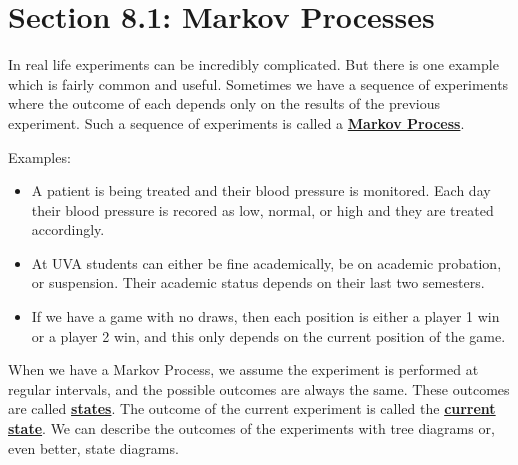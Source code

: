 \documentclass[14,fleqn]{article}
\newcommand{\defn}[1]{\textbf{\underline{#1}}}
\begin{document}
\section{Section 8.1: Markov Processes}

In real life experiments can be incredibly complicated. But there is one example which is fairly common and useful. Sometimes we have a sequence of experiments where the outcome of each depends only on the results of the previous experiment. Such a sequence of experiments is called a \defn{Markov Process}.

Examples:
\begin{itemize}
	\item A patient is being treated and their blood pressure is monitored. Each day their blood pressure is recored as low, normal, or high and they are treated accordingly.
	\item At UVA students can either be fine academically, be on academic probation, or suspension. Their academic status depends on their last two semesters.
	\item If we have a game with no draws, then each position is either a player 1 win or a player 2 win, and this only depends on the current position of the game.
\end{itemize}

When we have a Markov Process, we assume the experiment is performed at regular intervals, and the possible outcomes are always the same. These outcomes are called \defn{states}. The outcome of the current experiment is called the \defn{current state}. We can describe the outcomes of the experiments with tree diagrams or, even better, state diagrams.
\end{document}

